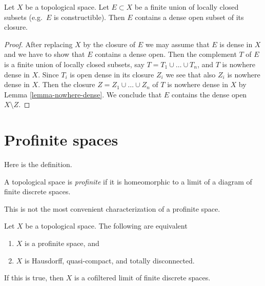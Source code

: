 \begin{lemma}
\label{lemma-dense-in-constructible}
Let $X$ be a topological space. Let $E \subset X$ be a finite union
of locally closed subsets (e.g.\ $E$ is constructible). Then $E$
contains a dense open subset of its closure.
\end{lemma}

\begin{proof}
After replacing $X$ by the closure of $E$ we may assume that $E$
is dense in $X$ and we have to show that $E$ contains a dense open.
Then the complement $T$ of $E$ is a finite union of locally closed subsets,
say $T = T_1 \cup \ldots \cup T_n$, and $T$ is nowhere dense in $X$.
Since $T_i$ is open dense in its closure $Z_i$ we see that also
$Z_i$ is nowhere dense in $X$. Then the closure $Z = Z_1 \cup \ldots \cup Z_n$
of $T$ is nowhere dense in $X$ by Lemma \ref{lemma-nowhere-dense}.
We conclude that $E$ contains the dense open $X \setminus Z$.
\end{proof}






\section{Profinite spaces}
\label{section-profinite}

\noindent
Here is the definition.

\begin{definition}
\label{definition-profinite}
A topological space is {\it profinite} if it is homeomorphic to a limit
of a diagram of finite discrete spaces.
\end{definition}

\noindent
This is not the most convenient characterization of a profinite space.

\begin{lemma}
\label{lemma-profinite}
Let $X$ be a topological space.
The following are equivalent
\begin{enumerate}
\item $X$ is a profinite space, and
\item $X$ is Hausdorff, quasi-compact, and totally disconnected.
\end{enumerate}
If this is true, then $X$ is a cofiltered limit of finite discrete
spaces.
\end{lemma}

